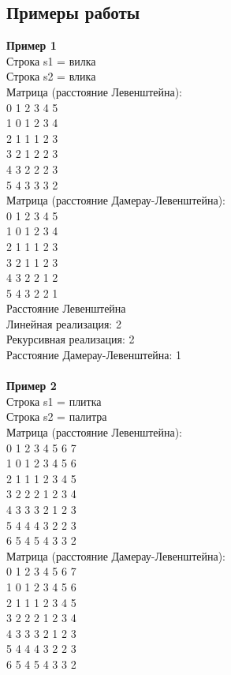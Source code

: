 \documentclass[a4paper, 14pt]{article}
\begin{document}
	\subsection{Примеры работы}
	\textbf {Пример 1}\\
	Строка s1 = вилка\\
    Строка s2 = влика\\
    Матрица (расстояние Левенштейна):\\
    0 1 2 3 4 5\\
    1 0 1 2 3 4\\ 
    2 1 1 1 2 3\\
    3 2 1 2 2 3\\
    4 3 2 2 2 3\\
    5 4 3 3 3 2\\
    Матрица (расстояние Дамерау-Левенштейна):\\
    0 1 2 3 4 5\\
    1 0 1 2 3 4\\
    2 1 1 1 2 3\\
    3 2 1 1 2 3\\
    4 3 2 2 1 2\\
    5 4 3 2 2 1\\
    Расстояние Левенштейна\\
    Линейная реализация: 2\\
    Рекурсивная реализация: 2\\
    Расстояние Дамерау-Левенштейна: 1\\\\
    \textbf {Пример 2}\\
	Строка s1 = плитка\\
    Строка s2 = палитра\\
    Матрица (расстояние Левенштейна):\\
    0 1 2 3 4 5 6 7\\
    1 0 1 2 3 4 5 6\\
    2 1 1 1 2 3 4 5\\
    3 2 2 2 1 2 3 4\\
    4 3 3 3 2 1 2 3\\
    5 4 4 4 3 2 2 3\\
    6 5 4 5 4 3 3 2\\
    Матрица (расстояние Дамерау-Левенштейна):\\
    0 1 2 3 4 5 6 7\\
    1 0 1 2 3 4 5 6\\
    2 1 1 1 2 3 4 5\\
    3 2 2 2 1 2 3 4\\
    4 3 3 3 2 1 2 3\\
    5 4 4 4 3 2 2 3\\
    6 5 4 5 4 3 3 2\\
\end{document}
